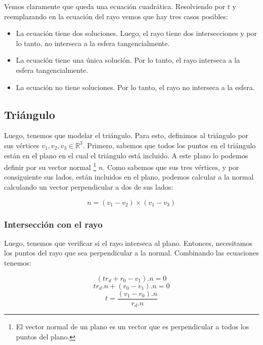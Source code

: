 Vemos claramente que queda una ecuación cuadrática. Resolviendo por $t$ y reemplazando en la ecuación del rayo vemos que hay tres casos posibles:
\begin{itemize}
\item La ecuación tiene dos soluciones. Luego, el rayo tiene dos intersecciones y por lo tanto, no interseca a la esfera tangencialmente.
\item La ecuación tiene una única solución. Por lo tanto, el rayo interseca a la esfera tangencialmente.
\item La ecuación no tiene soluciones. Por lo tanto, el rayo no interseca a la esfera.
\end{itemize}

\subsection{Triángulo}

Luego, tenemos que modelar el triángulo. Para esto, definimos al triángulo por sus vértices $v_1,v_2,v_3 \in \mathbb{R}^3$. Primero, sabemos que todos los puntos en el triángulo están en el plano en el cual el triángulo está incluido. A este plano lo podemos definir por su vector normal \footnote{El vector normal de un plano es un vector que es perpendicular a todos los puntos del plano.} $n$. Como sabemos que sus tres vértices, y por consiguiente sus lados, están incluidos en el plano, podemos calcular a la normal calculando un vector perpendicular a dos de sus lados:

\begin{equation}
n = (v_1 - v_2) \times (v_1 - v_3)
\end{equation}

\subsubsection{Intersección con el rayo}

Luego, tenemos que verificar si el rayo interseca al plano. Entonces, necesitamos los puntos del rayo que sea perpendicular a la normal. Combinando las ecuaciones tenemos:

\begin{equation}
(tr_d + r_0 - v_1) . n = 0
\end{equation}
\begin{equation}
tr_d . n + (r_0 - v_1) . n = 0
\end{equation}
\begin{equation}
t = \dfrac{(v_1 - r_0) . n}{r_d . n}
\end{equation}

